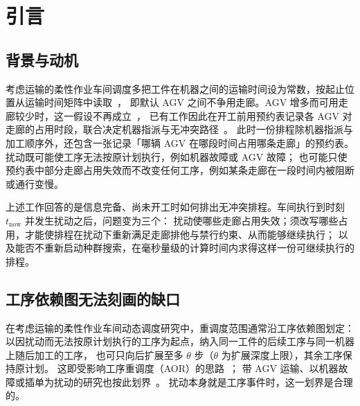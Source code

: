 \documentclass[manuscript,screen,review]{acmart}
\begin{document}
\maketitle

\section{引言}
\label{sec:introduction}

\subsection{背景与动机}

考虑运输的柔性作业车间调度多把工件在机器之间的运输时间设为常数，按起止位置从运输时间矩阵中读取~\cite{xin2025review,meng2025cp,qin2026knowledge}，
即默认 AGV 之间不争用走廊。AGV 增多而可用走廊较少时，这一假设不再成立~\cite{kim2026congestion}，
已有工作因此在开工前用预约表记录各 AGV 对走廊的占用时段，联合决定机器指派与无冲突路径~\cite{vanos2026exact,sun2023integrated,lyu2019approach,li2026framework}。
此时一份排程除机器指派与加工顺序外，还包含一张记录「哪辆 AGV 在哪段时间占用哪条走廊」的预约表。
扰动既可能使工序无法按原计划执行，例如机器故障或 AGV 故障；
也可能只使预约表中部分走廊占用失效而不改变任何工序，例如某条走廊在一段时间内被阻断或通行变慢。

上述工作回答的是信息完备、尚未开工时如何排出无冲突排程。车间执行到时刻 \(t_{\mathrm{now}}\) 并发生扰动之后，问题变为三个：
扰动使哪些走廊占用失效；须改写哪些占用，才能使排程在扰动下重新满足走廊排他与禁行约束、从而能够继续执行；
以及能否不重新启动种群搜索，在毫秒量级的计算时间内求得这样一份可继续执行的排程。

\subsection{工序依赖图无法刻画的缺口}

在考虑运输的柔性作业车间动态调度研究中，重调度范围通常沿工序依赖图划定：
以因扰动而无法按原计划执行的工序为起点，纳入同一工件的后续工序与同一机器上随后加工的工序，
也可只向后扩展至多 \(\theta\) 步（\(\theta\) 为扩展深度上限），其余工序保持原计划。
这即受影响工序重调度（AOR）的思路~\cite{subramaniam2003maor}；
带 AGV 运输、以机器故障或插单为扰动的研究也按此划界~\cite{zhang2023energy,tang2026dynamic}。
扰动本身就是工序事件时，这一划界是合理的。
\end{document}
